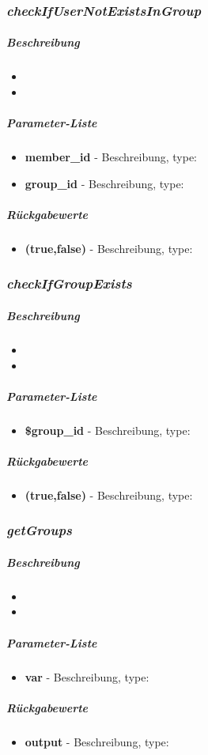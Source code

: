 \subsubsection*{\textit{checkIfUserNotExistsInGroup}}\label{checkIfUserNotExistsInGroupMGUI}
\subparagraph{Beschreibung}
\begin{itemize}
	\item[] \noindent{} 
	\item[] 
\end{itemize}
\subparagraph{Parameter-Liste}
\begin{itemize}
	\item[] \textbf{member\_id} - Beschreibung, type: 
	\item[] \textbf{group\_id} - Beschreibung, type: 
\end{itemize}
\subparagraph{Rückgabewerte}
\begin{itemize}
	\item[] \textbf{(true,false)} - Beschreibung, type:
\end{itemize}

\subsubsection*{\textit{checkIfGroupExists}}\label{checkIfGroupExistsMGUI}
\subparagraph{Beschreibung}
\begin{itemize}
	\item[] \noindent{} 
	\item[] 
\end{itemize}
\subparagraph{Parameter-Liste}
\begin{itemize}
	\item[] \textbf{\$group\_id} - Beschreibung, type: 
\end{itemize}
\subparagraph{Rückgabewerte}
\begin{itemize}
	\item[] \textbf{(true,false)} - Beschreibung, type:
\end{itemize}

\subsubsection*{\textit{getGroups}}\label{getGroupsMGUI}
\subparagraph{Beschreibung}
\begin{itemize}
	\item[] \noindent{} 
	\item[] 
\end{itemize}
\subparagraph{Parameter-Liste}
\begin{itemize}
	\item[] \textbf{var} - Beschreibung, type: 
\end{itemize}
\subparagraph{Rückgabewerte}
\begin{itemize}
	\item[] \textbf{output} - Beschreibung, type:
\end{itemize}

